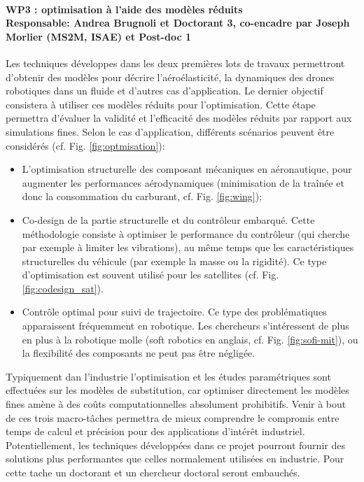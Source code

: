 \documentclass[12pt, french]{article}
\begin{document}
\paragraph{\large WP3 : optimisation à l'aide des modèles réduits\\
	Responsable: Andrea Brugnoli et Doctorant 3, co-encadre par Joseph Morlier (MS2M, ISAE) et Post-doc 1\\}

Les techniques développes dans les deux premières lots de travaux permettront d'obtenir des modèles pour décrire l'aéroélasticité, la dynamiques des drones robotiques dans un fluide et d'autres cas d'application.
Le dernier objectif consistera à utiliser ces modèles réduits pour l'optimisation. Cette étape permettra d'évaluer la validité et l'efficacité des modèles réduits par rapport aux simulations fines. Selon le cas d'application, différents scénarios peuvent être considérés (cf. Fig. \ref{fig:optmisation}): 
\begin{itemize}
	\item L'optimisation structurelle des composant mécaniques en aéronautique, pour augmenter les performances aérodynamiques (minimisation de la traînée et donc la consommation du carburant, cf. Fig. \ref{fig:wing}); 
	\item Co-design de la partie structurelle et du contrôleur embarqué. Cette méthodologie consiste à optimiser le performance du contrôleur (qui cherche par exemple à limiter les vibrations), au même temps que les caractéristiques structurelles du véhicule (par exemple la masse ou la rigidité). Ce type d'optimisation est souvent utilisé pour les satellites (cf. Fig. \ref{fig:codesign_sat}).
	\item Contrôle optimal pour suivi de trajectoire. Ce type des problématiques apparaissent fréquemment en robotique. Les chercheurs s'intéressent de plus en plus à la robotique molle (soft robotics en anglais, cf. Fig. \ref{fig:sofi-mit}), ou la flexibilité des composants ne peut pas être négligée.
\end{itemize}

Typiquement dan l'industrie l'optimisation et les études paramétriques sont effectuées sur les
modèles de substitution, car optimiser directement les modèles fines amène à des coûts computationnelles absolument prohibitifs. Venir à bout de ces trois macro-tâches permettra de mieux comprendre le compromis entre temps de calcul et précision pour des applications d'intérêt industriel. Potentiellement, les techniques développées dans ce projet pourront fournir des solutions plus performantes que celles normalement utilisées en industrie. Pour cette tache un doctorant et un chercheur doctoral seront embauchés. 
\end{document}
